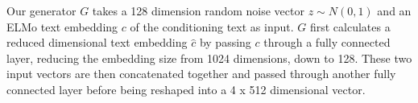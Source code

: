 Our generator $G$ takes a 128 dimension random noise vector $z \sim N(0, 1)$ and an ELMo text embedding $c$ of the conditioning text as input. $G$ first calculates a reduced dimensional text embedding $\hat{c}$ by passing $c$ through a fully connected layer, reducing the embedding size from 1024 dimensions, down to 128. These two input vectors are then concatenated together and passed through another fully connected layer before being reshaped into a 4 x 512 dimensional vector.